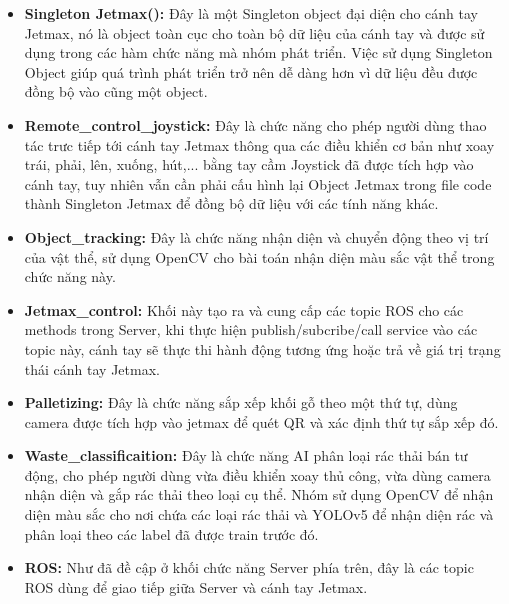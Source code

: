 \begin{itemize}
    \item \textbf{Singleton Jetmax():} Đây là một Singleton object đại diện cho cánh tay Jetmax, nó là object toàn cục cho toàn bộ dữ liệu của cánh tay và được sử dụng trong các hàm chức năng mà nhóm phát triển. Việc sử dụng Singleton Object giúp quá trình phát triển trở nên dễ dàng hơn vì dữ liệu đều được đồng bộ vào cũng một object.
    \item \textbf{Remote\_control\_joystick:} Đây là chức năng cho phép người dùng thao tác trưc tiếp tới cánh tay Jetmax thông qua các điều khiển cơ bản như xoay trái, phải, lên, xuống, hút,... bằng tay cầm Joystick đã được tích hợp vào cánh tay, tuy nhiên vẫn cần phải cấu hình lại Object Jetmax trong file code thành Singleton Jetmax để đồng bộ dữ liệu với các tính năng khác.
    \item \textbf{Object\_tracking:} Đây là chức năng nhận diện và chuyển động theo vị trí của vật thể, sử dụng OpenCV cho bài toán nhận diện màu sắc vật thể trong chức năng này.
    \item \textbf{Jetmax\_control:} Khối này tạo ra và cung cấp các topic ROS cho các methods trong Server, khi thực hiện publish/subcribe/call service vào các topic này, cánh tay sẽ thực thi hành động tương ứng hoặc trả về giá trị trạng thái cánh tay Jetmax.
    \item \textbf{Palletizing:} Đây là chức năng sắp xếp khối gỗ theo một thứ tự, dùng camera được tích hợp vào jetmax để quét QR và xác định thứ tự sắp xếp đó.
    \item \textbf{Waste\_classificaition:} Đây là chức năng AI phân loại rác thải bán tư động, cho phép người dùng vừa điều khiển xoay thủ công, vừa dùng camera nhận diện và gắp rác thải theo loại cụ thể. Nhóm sử dụng OpenCV để nhận diện màu sắc cho nơi chứa các loại rác thải và YOLOv5 để nhận diện rác và phân loại theo các label đã được train trước đó. 
    \item \textbf{ROS:} Như đã đề cập ở khối chức năng Server phía trên, đây là các topic ROS dùng để giao tiếp giữa Server và cánh tay Jetmax.
\end{itemize}
